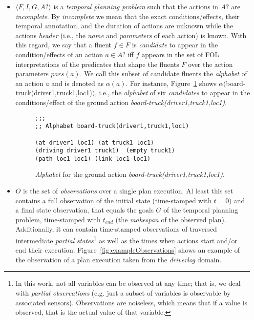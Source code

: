 \documentclass{ecai}
\newcommand{\tup}[1]{{\langle #1 \rangle}}
\begin{document}
\begin{itemize}
\item $\tup{F,I,G,A?}$ is a {\em temporal planning problem} such that the actions in $A?$ are {\em incomplete}. By {\em incomplete} we mean that the exact conditions/effects, their temporal annotation, and the duration of actions are unknown while the actions {\em header} (i.e., the {\em  name} and {\em parameters} of each action) is known. With this regard, we say that a fluent $f\in F$ is {\em candidate} to appear in the condition/effects of an action $a\in A?$ iff $f$ appears in the set of FOL interpretations of the predicates that shape the fluents $F$ over the action parameters $pars(a)$. We call this subset of candidate fluents the {\em alphabet} of an action $a$ and is denoted as $\alpha(a)$. For instance, Figure~\ref{fig:exampleCandidates} shows $\alpha($board-truck(driver1,truck1,loc1)$)$, i.e., the {\em alphabet} of six {\em candidates} to appear in the conditions/effect of the ground action {\em board-truck(driver1,truck1,loc1)}.
 
\begin{figure}[hbt!]
\begin{footnotesize}    
\begin{verbatim}
;;;
;; Alphabet board-truck(driver1,truck1,loc1)

(at driver1 loc1) (at truck1 loc1) 
(driving driver1 truck1)  (empty truck1) 
(path loc1 loc1) (link loc1 loc1)
\end{verbatim}
\end{footnotesize}    
\caption{{\em Alphabet} for the ground action {\em board-truck(driver1,truck1,loc1)}.}
\label{fig:exampleCandidates}
\end{figure}  
 
\item $O$ is the set of {\em observations} over a single plan execution. Al least this set contains a full observation of the initial state (time-stamped with $t=0$) and a final state observation, that equals the goals $G$ of the temporal planning problem, time-stamped with $t_{end}$ (the {\em makespan} of the observed plan). Additionally, it can contain time-stamped observations of traversed intermediate {\em partial states}\footnote{In this work, not all variables can be observed at any time; that is, we deal with {\em partial observations} (e.g. just a subset of variables is observable by associated sensors). Observations are noiseless, which means that if a value is observed, that is the actual value of that variable.} as well as the times when actions start and/or end their execution. Figure~\ref{fig:exampleObservations} shows an example of the observation of a plan execution taken from the {\em driverlog} domain.


\end{itemize}
\end{document}
